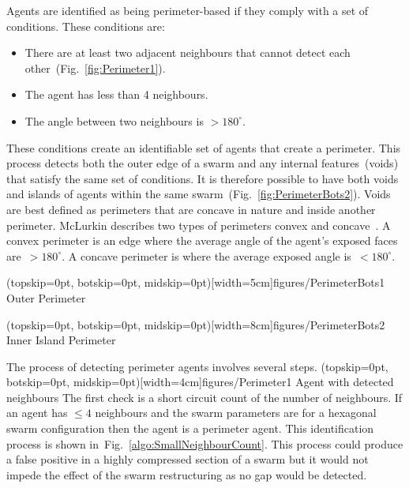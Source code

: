 \documentclass{ieeeaccess}
\begin{document}
Agents are identified as being perimeter-based if they comply with a set of conditions. These conditions are: 
\begin{itemize}
  \item There are at least two adjacent neighbours that cannot detect each other~(Fig.~\ref{fig:Perimeter1}).
  \item The agent has less than 4 neighbours.
  \item The angle between two neighbours is $> 180^\circ$.
\end{itemize} 

These conditions create an identifiable set of agents that create a perimeter.
This process detects both the outer edge of a swarm and any internal features~(voids) that satisfy the same set of conditions. It is therefore possible to have both voids and islands of agents within the same swarm~(Fig.~\ref{fig:PerimeterBots2}). Voids are best defined as perimeters that are concave in nature and inside another perimeter. McLurkin describes two types of perimeters convex and concave~\cite{MD:09}. A convex perimeter is an edge where the average angle of the agent's exposed faces are~$> 180^\circ$. A concave perimeter is where the average exposed angle is~$< 180^\circ$.

\Figure[t!](topskip=0pt, botskip=0pt, midskip=0pt)[width=5cm]{figures/PerimeterBots1}
{Outer Perimeter\label{fig:PerimeterBots1}}

\Figure[t!](topskip=0pt, botskip=0pt, midskip=0pt)[width=8cm]{figures/PerimeterBots2}
{Inner Island Perimeter\label{fig:PerimeterBots2}}

The process of detecting perimeter agents involves several steps. 
\Figure[t!](topskip=0pt, botskip=0pt, midskip=0pt)[width=4cm]{figures/Perimeter1}
{Agent with detected neighbours\label{fig:Perimeter1}}
The first check is a short circuit count of the number of neighbours. If an agent has $\leq 4$ neighbours and the swarm parameters are for a hexagonal swarm configuration then the agent is a perimeter agent. This identification process is shown in~Fig.~\ref{algo:SmallNeighbourCount}. This process could produce a false positive in a highly compressed section of a swarm but it would not impede the effect of the swarm restructuring as no gap would be detected. 
\end{document}
